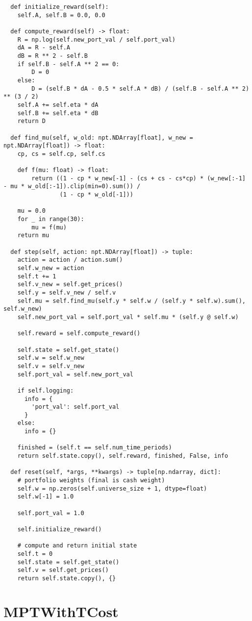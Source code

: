 \begin{verbatim}
  def initialize_reward(self):
    self.A, self.B = 0.0, 0.0

  def compute_reward(self) -> float:
    R = np.log(self.new_port_val / self.port_val)
    dA = R - self.A
    dB = R ** 2 - self.B
    if self.B - self.A ** 2 == 0:
        D = 0
    else:
        D = (self.B * dA - 0.5 * self.A * dB) / (self.B - self.A ** 2) ** (3 / 2)
    self.A += self.eta * dA
    self.B += self.eta * dB
    return D

  def find_mu(self, w_old: npt.NDArray[float], w_new = npt.NDArray[float]) -> float:
    cp, cs = self.cp, self.cs

    def f(mu: float) -> float:
        return ((1 - cp * w_new[-1] - (cs + cs - cs*cp) * (w_new[:-1] - mu * w_old[:-1]).clip(min=0).sum()) /
                (1 - cp * w_old[-1]))

    mu = 0.0
    for _ in range(30):
        mu = f(mu)
    return mu

  def step(self, action: npt.NDArray[float]) -> tuple:
    action = action / action.sum()
    self.w_new = action
    self.t += 1
    self.v_new = self.get_prices()
    self.y = self.v_new / self.v
    self.mu = self.find_mu(self.y * self.w / (self.y * self.w).sum(), self.w_new)
    self.new_port_val = self.port_val * self.mu * (self.y @ self.w)

    self.reward = self.compute_reward()

    self.state = self.get_state()
    self.w = self.w_new
    self.v = self.v_new
    self.port_val = self.new_port_val

    if self.logging:
      info = {
        'port_val': self.port_val
      }
    else:
      info = {}

    finished = (self.t == self.num_time_periods)
    return self.state.copy(), self.reward, finished, False, info

  def reset(self, *args, **kwargs) -> tuple[np.ndarray, dict]:
    # portfolio weights (final is cash weight)
    self.w = np.zeros(self.universe_size + 1, dtype=float)
    self.w[-1] = 1.0

    self.port_val = 1.0

    self.initialize_reward()

    # compute and return initial state
    self.t = 0
    self.state = self.get_state()
    self.v = self.get_prices()
    return self.state.copy(), {}
\end{verbatim}

\section{MPTWithTCost}

